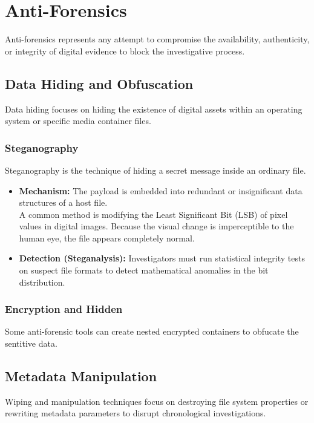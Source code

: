 \section{Anti-Forensics}

Anti-forensics represents any attempt to compromise the availability, authenticity, or integrity of digital evidence to block the investigative process.

\subsection{Data Hiding and Obfuscation}

Data hiding focuses on hiding the existence of digital assets within an operating system or specific media container files.

\subsubsection*{Steganography}
Steganography is the technique of hiding a secret message inside an ordinary file.

\begin{itemize}
    \item \textbf{Mechanism:} The payload is embedded into redundant or insignificant data structures of a host file.\\
    A common method is modifying the Least Significant Bit (LSB) of pixel values in digital images. Because the visual change is imperceptible to the human eye, the file appears completely normal.
    \item \textbf{Detection (Steganalysis):} Investigators must run statistical integrity tests on suspect file formats to detect mathematical anomalies in the bit distribution.
\end{itemize}

\subsubsection*{Encryption and Hidden}
Some anti-forensic tools can create nested encrypted containers to obfucate the sentitive data.

\subsection{ Metadata Manipulation}

Wiping and manipulation techniques focus on destroying file system properties or rewriting metadata parameters to disrupt chronological investigations.

